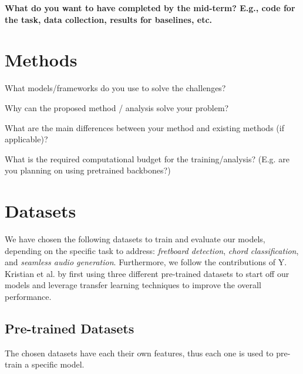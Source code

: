 \documentclass[10pt,twocolumn,letterpaper]{article}
\begin{document}
\textbf{What do you want to have completed by the mid-term? E.g., code for the task, data collection, results for baselines, etc.}




\section{Methods}\label{sec:methods}

What models/frameworks do you use to solve the challenges?

Why can the proposed method / analysis solve your problem?

What are the main differences between your method and existing methods (if applicable)?

What is the required computational budget for the training/analysis? (E.g. are you planning on using pretrained backbones?)

\section{Datasets}\label{sec:datasets}

We have chosen the following datasets to train and evaluate our models, depending on the specific task to address: \emph{fretboard detection}, \emph{chord classification}, and \emph{seamless audio generation}. Furthermore, we follow the contributions of Y. Kristian et al. \cite{Kristian_Zaman_Tenoyo_Jodhinata_2024} by first using three different pre-trained datasets to start off our models and leverage transfer learning techniques to improve the overall performance.
\subsection{Pre-trained Datasets}
The chosen datasets have each their own features, thus each one is used to pre-train a specific model.
\end{document}
